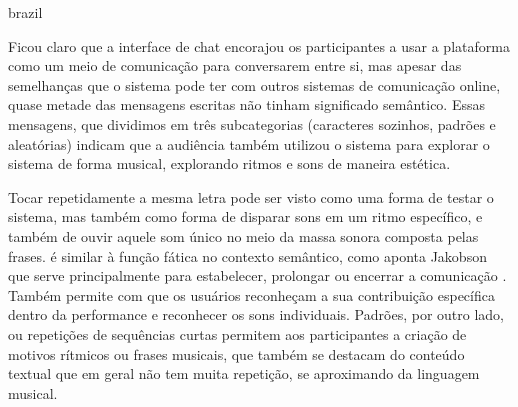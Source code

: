 \begin{otherlanguage*}{brazil}


Ficou claro que a interface de chat encorajou os participantes a usar a plataforma como um meio de comunicação para conversarem entre si, mas apesar das semelhanças que o sistema pode ter com outros sistemas de comunicação online, quase metade das mensagens escritas não tinham significado semântico. Essas mensagens, que dividimos em três subcategorias (caracteres sozinhos, padrões e aleatórias) indicam que a audiência também utilizou o sistema para explorar o sistema de forma musical, explorando ritmos e sons de maneira estética.


Tocar repetidamente a mesma letra pode ser visto como uma forma de testar o sistema, mas também como forma de disparar sons em um ritmo específico, e também de ouvir aquele som único no meio da massa sonora composta pelas frases. é similar à função fática no contexto semântico, como aponta Jakobson que serve principalmente para estabelecer, prolongar ou encerrar a comunicação \cite{Jakobson}. Também permite com que os usuários reconheçam a sua contribuição específica dentro da performance e reconhecer os sons individuais. Padrões, por outro lado, ou repetições de sequências curtas permitem aos participantes a criação de motivos rítmicos ou frases musicais, que também se destacam do conteúdo textual que em geral não tem muita repetição, se aproximando da linguagem musical.


\end{otherlanguage*}
